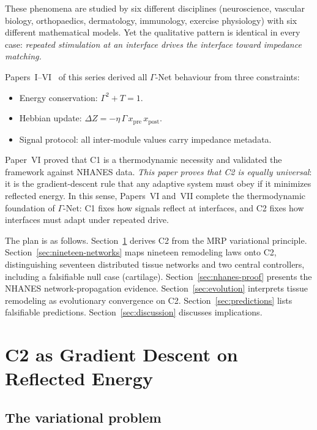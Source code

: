 \documentclass[aps,pre,twocolumn,superscriptaddress,floatfix]{revtex4-2}
\begin{document}
These phenomena are studied by six different disciplines
(neuroscience, vascular biology, orthopaedics, dermatology,
immunology, exercise physiology) with six different
mathematical models.
Yet the qualitative pattern is identical in every case:
\emph{repeated stimulation at an interface drives the
interface toward impedance matching.}

Papers~I--VI~\cite{PaperI,PaperII,PaperIII,PaperIV,PaperV,PaperVI}
of this series derived all $\Gamma$-Net behaviour from
three constraints:
\begin{itemize}
  \item[\textbf{C1}] Energy conservation:
    $\Gamma^2 + T = 1$.
  \item[\textbf{C2}] Hebbian update:
    $\Delta Z = -\eta\,\Gamma\,x_{\text{pre}}\,x_{\text{post}}$.
  \item[\textbf{C3}] Signal protocol:
    all inter-module values carry impedance metadata.
\end{itemize}
Paper~VI proved that C1 is a thermodynamic necessity and
validated the framework against NHANES data.
\emph{This paper proves that C2 is equally universal}:
it is the gradient-descent rule that any adaptive system
must obey if it minimizes reflected energy.
In this sense, Papers~VI and~VII complete the thermodynamic
foundation of $\Gamma$-Net: C1 fixes how signals reflect
at interfaces, and C2 fixes how interfaces must adapt
under repeated drive.

The plan is as follows.
Section~\ref{sec:c2-derivation} derives C2 from the MRP
variational principle.
Section~\ref{sec:nineteen-networks} maps nineteen
remodeling laws onto C2, distinguishing seventeen distributed
tissue networks and two central controllers,
including a falsifiable null case (cartilage).
Section~\ref{sec:nhanes-proof} presents the NHANES
network-propagation evidence.
Section~\ref{sec:evolution} interprets tissue remodeling
as evolutionary convergence on C2.
Section~\ref{sec:predictions} lists falsifiable predictions.
Section~\ref{sec:discussion} discusses implications.


\section{C2 as Gradient Descent on Reflected Energy}
\label{sec:c2-derivation}

\subsection{The variational problem}
\end{document}
